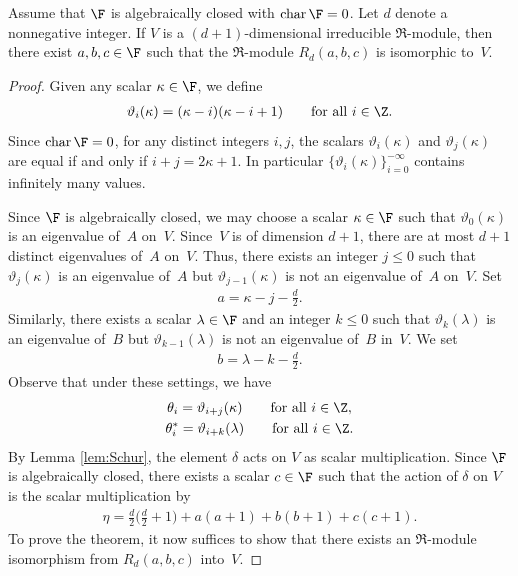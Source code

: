 \begin{Theorem}\label{thm:surjective}Assume that $\F$ is algebraically closed with $\operatorname{char}\F=0$. Let $d$ denote a nonnegative integer. If $V$ is a $(d + 1)$-dimensional irreducible $\Re$-module, then there exist $a, b, c \in \F$ such that the $\Re$-module $R_d(a, b, c)$ is isomorphic to~$V$.
\end{Theorem}
\begin{proof}Given any scalar $\kappa \in \F$, we define
\begin{gather*}
\vartheta_i(\kappa)
=(\kappa-i)(\kappa-i+1)
\qquad
\hbox{for all $i\in \Z$}.
\end{gather*}
Since $\operatorname{char}\F=0$, for any distinct integers $i,j$, the scalars $\vartheta_i(\kappa)$ and $\vartheta_j(\kappa)$ are equal if and only if $i+j=2\kappa+1$. In particular $\{\vartheta_i(\kappa)\}_{i=0}^{-\infty}$ contains infinitely many values.

Since $\F$ is algebraically closed, we may choose a scalar $\kappa\in \F$ such that $\vartheta_0(\kappa)$ is an eigenvalue of~$A$ on~$V$. Since~$V$ is of dimension $d+1$, there are at most $d+1$ distinct eigenvalues of~$A$ on~$V$. Thus, there exists an integer $j\leq 0$ such that $\vartheta_j(\kappa)$ is an eigenvalue of~$A$ but $\vartheta_{j-1}(\kappa)$ is not an eigenvalue of~$A$ on~$V$. Set
\begin{gather*}
a=\kappa-j-\tfrac{d}{2}.
\end{gather*}
Similarly, there exists a scalar $\lambda\in \F$ and an integer $k\leq 0$ such that $\vartheta_k(\lambda)$ is an eigenvalue of~$B$ but $\vartheta_{k-1}(\lambda)$ is not an eigenvalue of~$B$ in~$V$. We set
\begin{gather*}
b=\lambda-k-\tfrac{d}{2}.
\end{gather*}
Observe that under these settings, we have
\begin{gather}
\theta_i = \vartheta_{i+j}(\kappa) \qquad\hbox{for all $i\in \Z$},\label{setting:a}\\
\theta_i^* = \vartheta_{i+k}(\lambda)\qquad\hbox{for all $i\in \Z$}.\label{setting:b}
\end{gather}
By Lemma \ref{lem:Schur}, the element $\delta$ acts on $V$ as scalar multiplication. Since $\F$ is algebraically closed, there exists a scalar $c\in \F$ such that the action of $\delta$ on $V$ is the scalar multiplication by
\begin{gather*}
\eta=\textstyle\frac{d}{2}\big(\frac{d}{2}+1\big)+a(a+1)+b(b+1)+c(c+1).
\end{gather*}
To prove the theorem, it now suffices to show that there exists an $\Re$-module isomorphism from $R_d(a,b,c)$ into~$V$.


\end{proof}
